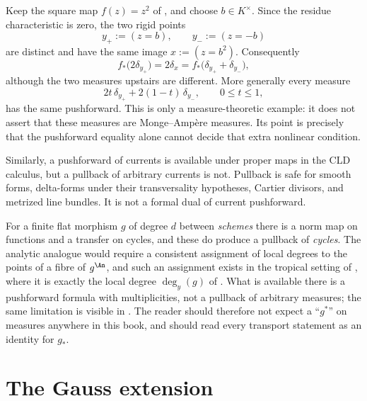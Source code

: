 \begin{example}
\label{ex:ch30-two-measures}
Keep the square map \(f(z)=z^2\) of , and choose
\(b\in K^\times\).  Since the residue characteristic is zero, the two rigid
points
\[
                    y_+:=(z=b),\qquad y_-:=(z=-b)
\]
are distinct and have the same image \(x:=(z=b^2)\).  Consequently
\[
 f_*\bigl(2\delta_{y_+}\bigr)
   =2\delta_x
   =f_*\bigl(\delta_{y_+}+\delta_{y_-}\bigr),
\]
although the two measures upstairs are different.  More generally every
measure
\[
              2t\,\delta_{y_+}+2(1-t)\,\delta_{y_-},
              \qquad 0\leq t\leq1,
\]
has the same pushforward.  This is only a measure-theoretic example: it
does not assert that these measures are Monge--Amp\`ere measures.  Its point
is precisely that the pushforward equality alone cannot decide that extra
nonlinear condition.
\end{example}

Similarly, a pushforward of currents is available under proper maps in the
CLD calculus, but a pullback of arbitrary currents is not.  Pullback is safe
for smooth forms, delta-forms under their transversality hypotheses, Cartier
divisors, and metrized line bundles.  It is not a formal dual of current
pushforward.

\begin{remark}
\label{rem:ch30-measure-pullback}
For a finite flat morphism \(g\) of degree \(d\) between \emph{schemes}
there is a norm map on functions and a transfer on cycles, and these do
produce a pullback of \emph{cycles}.  The analytic analogue would require a
consistent assignment of local degrees to the points of a fibre of
\(g^{\An}\), and such an assignment exists in the tropical setting of
, where it is exactly the local degree
\(\deg_y(g)\) of .  What is available
there is a pushforward formula with multiplicities, not a pullback of
arbitrary measures; the same limitation is visible in
.  The reader should therefore not expect
a ``\(g^*\)'' on measures anywhere in this book, and should read every
transport statement as an identity for \(g_*\).
\end{remark}

\section{The Gauss extension}
\label{sec:ch30-gauss}

